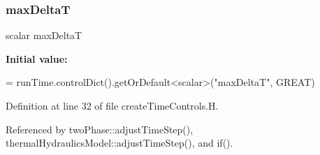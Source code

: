 \subsubsection{\texorpdfstring{max\+DeltaT}{maxDeltaT}}
{\footnotesize\ttfamily scalar max\+DeltaT}

{\bfseries Initial value\+:}
\begin{DoxyCode}
=
    runTime.controlDict().getOrDefault<scalar>(\textcolor{stringliteral}{"maxDeltaT"}, GREAT)
\end{DoxyCode}


Definition at line 32 of file create\+Time\+Controls.\+H.



Referenced by two\+Phase\+::adjust\+Time\+Step(), thermal\+Hydraulics\+Model\+::adjust\+Time\+Step(), and if().

